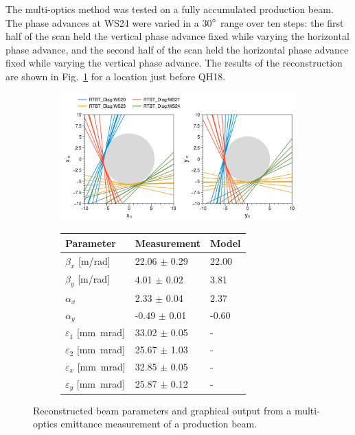 The multi-optics method was tested on a fully accumulated production beam. The phase advances at WS24 were varied in a 30$\degree$ range over ten steps: the first half of the scan held the vertical phase advance fixed while varying the horizontal phase advance, and the second half of the scan held the horizontal phase advance fixed while varying the vertical phase advance. The results of the reconstruction are shown in Fig.~\ref{fig:prod_meas} for a location just before QH18.
%
\begin{figure}[!p]
    \centering
    \begin{subfigure}{0.8\textwidth}
        \centering
        \includegraphics[width=\textwidth]{Images/chapter4/prod_meas_lines.png}  
    \end{subfigure}
    \par\medskip
    \begin{subfigure}{0.6\textwidth}
        \centering
        \begin{tabular}{lll}
            \small\textbf{Parameter} & \small\textbf{Measurement} & \small\textbf{Model} \\
            \midrule
            \small$\beta_x$ [m/rad] & \small22.06 $\pm$ 0.29 & \small22.00 \\
            \small$\beta_y$ [m/rad] & \small4.01 $\pm$ 0.02 & \small3.81 \\
            \small$\alpha_x$ & \small2.33 $\pm$ 0.04 & \small2.37 \\
            \small$\alpha_y$ & \small-0.49 $\pm$ 0.01 & \small-0.60 \\
            \small$\varepsilon_1$ [mm~mrad] & \small33.02 $\pm$ \small0.05 & - \\
            \small$\varepsilon_2$ [mm~mrad] & \small25.67 $\pm$ \small1.03 & - \\
            \small$\varepsilon_x$ [mm~mrad] & \small32.85 $\pm$ \small0.05 & - \\
            \small$\varepsilon_y$ [mm~mrad] & \small25.87 $\pm$ \small0.12 & - \\
          \end{tabular}
    \end{subfigure}
    \par\medskip
    \caption{Reconstructed beam parameters and graphical output from a multi-optics emittance measurement of a production beam.}
    \label{fig:prod_meas}
\end{figure}
